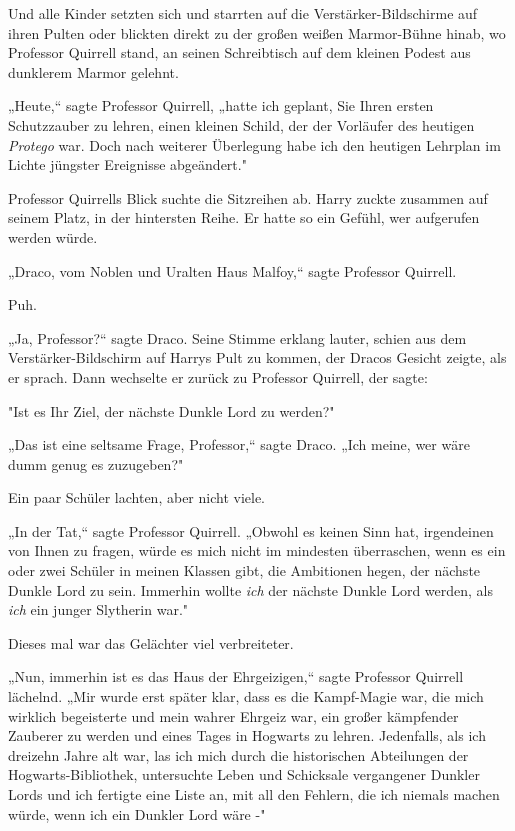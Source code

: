 {\hfill\break Und alle Kinder setzten sich und starrten auf die Verstärker-Bildschirme auf ihren Pulten oder blickten direkt zu der großen weißen Marmor-Bühne hinab, wo Professor Quirrell stand, an seinen Schreibtisch auf dem kleinen Podest aus dunklerem Marmor gelehnt.

„Heute,“ sagte Professor Quirrell, „hatte ich geplant, Sie Ihren ersten Schutzzauber zu lehren, einen kleinen Schild, der der Vorläufer des heutigen \emph{Protego} war. Doch nach weiterer Überlegung habe ich den heutigen Lehrplan im Lichte jüngster Ereignisse abgeändert."

Professor Quirrells Blick suchte die Sitzreihen ab. Harry zuckte zusammen auf seinem Platz, in der hintersten Reihe. Er hatte so ein Gefühl, wer aufgerufen werden würde.

„Draco, vom Noblen und Uralten Haus Malfoy,“ sagte Professor Quirrell.

Puh.

„Ja, Professor?“ sagte Draco. Seine Stimme erklang lauter, schien aus dem Verstärker-Bildschirm auf Harrys Pult zu kommen, der Dracos Gesicht zeigte, als er sprach. Dann wechselte er zurück zu Professor Quirrell, der sagte:

"Ist es Ihr Ziel, der nächste Dunkle Lord zu werden?"

„Das ist eine seltsame Frage, Professor,“ sagte Draco. „Ich meine, wer wäre dumm genug es zuzugeben?"

Ein paar Schüler lachten, aber nicht viele.

„In der Tat,“ sagte Professor Quirrell. „Obwohl es keinen Sinn hat, irgendeinen von Ihnen zu fragen, würde es mich nicht im mindesten überraschen, wenn es ein oder zwei Schüler in meinen Klassen gibt, die Ambitionen hegen, der nächste Dunkle Lord zu sein. Immerhin wollte \emph{ich} der nächste Dunkle Lord werden, als \emph{ich} ein junger Slytherin war."

Dieses mal war das Gelächter viel verbreiteter.

„Nun, immerhin ist es das Haus der Ehrgeizigen,“ sagte Professor Quirrell lächelnd. „Mir wurde erst später klar, dass es die Kampf-Magie war, die mich wirklich begeisterte und mein wahrer Ehrgeiz war, ein großer kämpfender Zauberer zu werden und eines Tages in Hogwarts zu lehren. Jedenfalls, als ich dreizehn Jahre alt war, las ich mich durch die historischen Abteilungen der Hogwarts-Bibliothek, untersuchte Leben und Schicksale vergangener Dunkler Lords und ich fertigte eine Liste an, mit all den Fehlern, die ich niemals machen würde, wenn ich ein Dunkler Lord wäre -"

}
